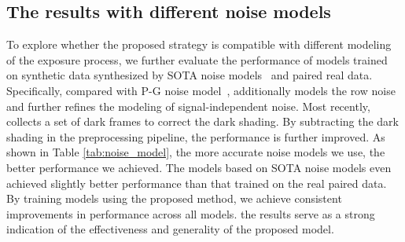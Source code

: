 \documentclass[10pt,twocolumn,letterpaper]{article}
\begin{document}
\subsection{The results with different noise models}
\label{sec:noise_model}
To explore whether the proposed strategy is compatible with different modeling of the exposure process, we further evaluate the performance of models trained on synthetic data synthesized by SOTA noise models~\cite{wei2020physics, feng2022learnability} and paired real data. Specifically, compared with P-G noise model~\cite{foi2008practical}, \cite{wei2020physics} additionally models the row noise and further refines the modeling of signal-independent noise. Most recently, \cite{feng2022learnability} collects a set of dark frames to correct the dark shading. By subtracting the dark shading in the preprocessing pipeline, the performance is further improved.
As shown in Table \ref{tab:noise_model}, the more accurate noise models we use, the better performance we achieved. The models based on SOTA noise models even achieved slightly better performance than that trained on the real paired data. 
By training models using the proposed method, we achieve consistent improvements in performance across all models. the results serve as a strong indication of the effectiveness and generality of the proposed model.
\end{document}
